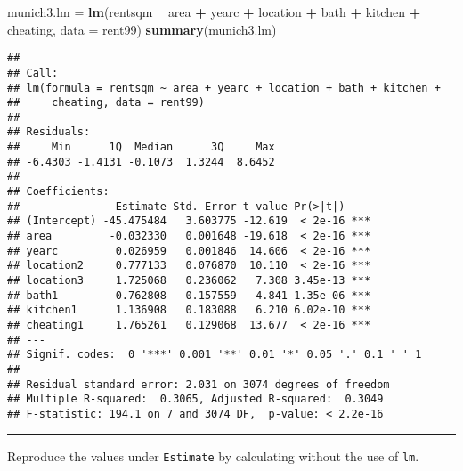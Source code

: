 \documentclass[]{article}
\newenvironment{Shaded}{\begin{snugshade}}{\end{snugshade}}
\newcommand{\DataTypeTok}[1]{\textcolor[rgb]{0.13,0.29,0.53}{#1}}
\newcommand{\KeywordTok}[1]{\textcolor[rgb]{0.13,0.29,0.53}{\textbf{#1}}}
\newcommand{\NormalTok}[1]{#1}
\newcommand{\OperatorTok}[1]{\textcolor[rgb]{0.81,0.36,0.00}{\textbf{#1}}}
\newcommand{\StringTok}[1]{\textcolor[rgb]{0.31,0.60,0.02}{#1}}
\begin{document}
\begin{Shaded}
\begin{Highlighting}[]
\NormalTok{munich3.lm =}\StringTok{ }\KeywordTok{lm}\NormalTok{(rentsqm }\OperatorTok{~}\StringTok{ }\NormalTok{area }\OperatorTok{+}\StringTok{ }\NormalTok{yearc }\OperatorTok{+}\StringTok{ }\NormalTok{location }\OperatorTok{+}\StringTok{ }\NormalTok{bath }\OperatorTok{+}\StringTok{ }\NormalTok{kitchen }\OperatorTok{+}\StringTok{ }
\StringTok{    }\NormalTok{cheating, }\DataTypeTok{data =}\NormalTok{ rent99)}
\KeywordTok{summary}\NormalTok{(munich3.lm)}
\end{Highlighting}
\end{Shaded}

\begin{verbatim}
## 
## Call:
## lm(formula = rentsqm ~ area + yearc + location + bath + kitchen + 
##     cheating, data = rent99)
## 
## Residuals:
##     Min      1Q  Median      3Q     Max 
## -6.4303 -1.4131 -0.1073  1.3244  8.6452 
## 
## Coefficients:
##               Estimate Std. Error t value Pr(>|t|)    
## (Intercept) -45.475484   3.603775 -12.619  < 2e-16 ***
## area         -0.032330   0.001648 -19.618  < 2e-16 ***
## yearc         0.026959   0.001846  14.606  < 2e-16 ***
## location2     0.777133   0.076870  10.110  < 2e-16 ***
## location3     1.725068   0.236062   7.308 3.45e-13 ***
## bath1         0.762808   0.157559   4.841 1.35e-06 ***
## kitchen1      1.136908   0.183088   6.210 6.02e-10 ***
## cheating1     1.765261   0.129068  13.677  < 2e-16 ***
## ---
## Signif. codes:  0 '***' 0.001 '**' 0.01 '*' 0.05 '.' 0.1 ' ' 1
## 
## Residual standard error: 2.031 on 3074 degrees of freedom
## Multiple R-squared:  0.3065, Adjusted R-squared:  0.3049 
## F-statistic: 194.1 on 7 and 3074 DF,  p-value: < 2.2e-16
\end{verbatim}

\normalsize

\begin{center}\rule{0.5\linewidth}{\linethickness}\end{center}

Reproduce the values under \texttt{Estimate} by calculating without the
use of \texttt{lm}.

\begin{Shaded}
\end{Shaded}
\end{document}

